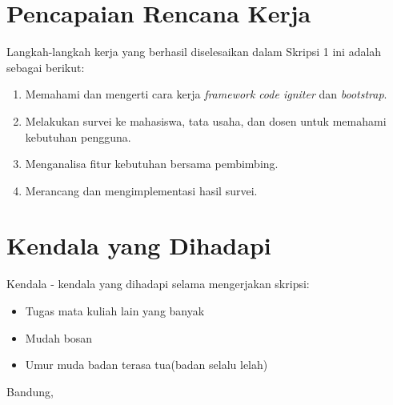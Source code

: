 \documentclass[a4paper,twoside]{article}
\begin{document}
\section{Pencapaian Rencana Kerja}
Langkah-langkah kerja yang berhasil diselesaikan dalam Skripsi 1 ini adalah sebagai berikut:
\begin{enumerate}
\item Memahami dan mengerti cara kerja \textit{framework} \textit{code igniter} dan \textit{bootstrap}.

\item Melakukan survei ke mahasiswa, tata usaha, dan dosen untuk memahami kebutuhan pengguna.

\item Menganalisa fitur kebutuhan bersama pembimbing.

\item Merancang dan mengimplementasi hasil survei.

\end{enumerate}



\section{Kendala yang Dihadapi}

Kendala - kendala yang dihadapi selama mengerjakan skripsi:
\begin{itemize}
	\item Tugas mata kuliah lain yang banyak
	\item Mudah bosan
	\item Umur muda badan terasa tua(badan selalu lelah)
\end{itemize}

\newpage
\vspace{1cm}
\centering Bandung, \tanggal\\
\vspace{2cm} \nama \\ 
\vspace{1cm}
\end{document}
